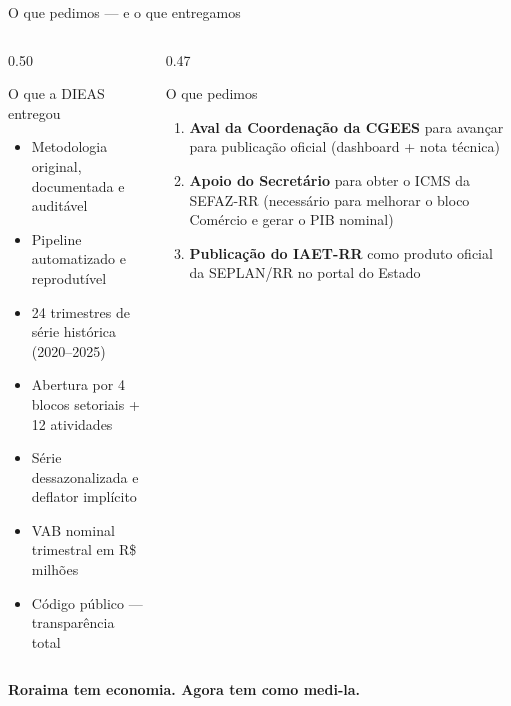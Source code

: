\documentclass[aspectratio=169, 11pt]{beamer}
\begin{document}
\begin{frame}{O que pedimos — e o que entregamos}

  \begin{columns}[T]
    \begin{column}{0.50\textwidth}
      \begin{block}{O que a DIEAS entregou}
        \begin{itemize}
          \item Metodologia original, documentada e auditável
          \item Pipeline automatizado e reprodutível
          \item 24 trimestres de série histórica (2020--2025)
          \item Abertura por 4 blocos setoriais + 12 atividades
          \item Série dessazonalizada e deflator implícito
          \item VAB nominal trimestral em R\$ milhões
          \item Código público — transparência total
        \end{itemize}
      \end{block}
    \end{column}

    \begin{column}{0.47\textwidth}
      \begin{exampleblock}{O que pedimos}
        \begin{enumerate}
          \item \textbf{Aval da Coordenação da CGEES} para avançar para
                publicação oficial (dashboard + nota técnica)

          \vspace{0.2cm}
          \item \textbf{Apoio do Secretário} para obter o ICMS da
                SEFAZ-RR (necessário para melhorar o bloco Comércio
                e gerar o PIB nominal)

          \vspace{0.2cm}
          \item \textbf{Publicação do IAET-RR} como produto oficial
                da SEPLAN/RR no portal do Estado
        \end{enumerate}
      \end{exampleblock}
    \end{column}
  \end{columns}

  \vspace{0.4cm}

  \begin{center}
    \large\color{seplanblue}
    \textbf{Roraima tem economia. Agora tem como medi-la.}
  \end{center}

\end{frame}
\end{document}
